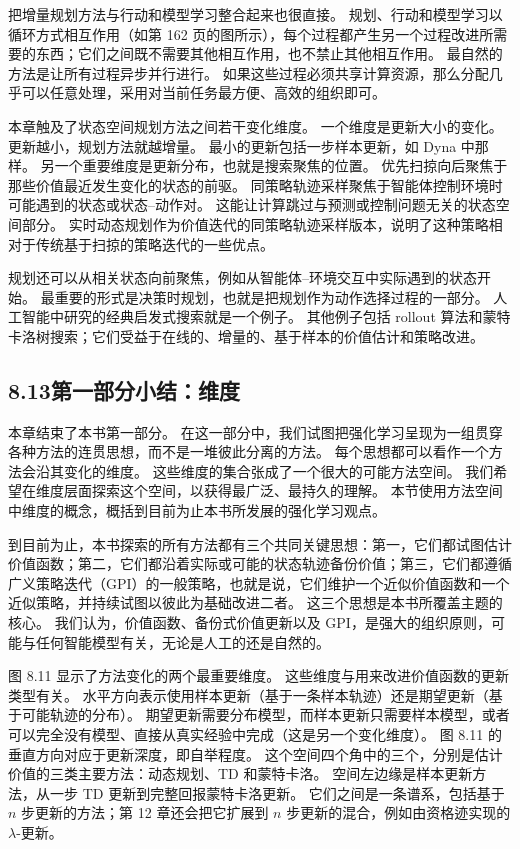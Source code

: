 \documentclass[UTF8, 12pt, fontset=fandol, oneside]{ctexart}
\begin{document}
把增量规划方法与行动和模型学习整合起来也很直接。
规划、行动和模型学习以循环方式相互作用（如第 162 页的图所示），每个过程都产生另一个过程改进所需要的东西；它们之间既不需要其他相互作用，也不禁止其他相互作用。
最自然的方法是让所有过程异步并行进行。
如果这些过程必须共享计算资源，那么分配几乎可以任意处理，采用对当前任务最方便、高效的组织即可。

本章触及了状态空间规划方法之间若干变化维度。
一个维度是更新大小的变化。
更新越小，规划方法就越增量。
最小的更新包括一步样本更新，如 Dyna 中那样。
另一个重要维度是更新分布，也就是搜索聚焦的位置。
优先扫掠向后聚焦于那些价值最近发生变化的状态的前驱。
同策略轨迹采样聚焦于智能体控制环境时可能遇到的状态或状态--动作对。
这能让计算跳过与预测或控制问题无关的状态空间部分。
实时动态规划作为价值迭代的同策略轨迹采样版本，说明了这种策略相对于传统基于扫掠的策略迭代的一些优点。

规划还可以从相关状态向前聚焦，例如从智能体--环境交互中实际遇到的状态开始。
最重要的形式是决策时规划，也就是把规划作为动作选择过程的一部分。
人工智能中研究的经典启发式搜索就是一个例子。
其他例子包括 rollout 算法和蒙特卡洛树搜索；它们受益于在线的、增量的、基于样本的价值估计和策略改进。

\subsection*{8.13\quad 第一部分小结：维度}

本章结束了本书第一部分。
在这一部分中，我们试图把强化学习呈现为一组贯穿各种方法的连贯思想，而不是一堆彼此分离的方法。
每个思想都可以看作一个方法会沿其变化的维度。
这些维度的集合张成了一个很大的可能方法空间。
我们希望在维度层面探索这个空间，以获得最广泛、最持久的理解。
本节使用方法空间中维度的概念，概括到目前为止本书所发展的强化学习观点。

到目前为止，本书探索的所有方法都有三个共同关键思想：第一，它们都试图估计价值函数；第二，它们都沿着实际或可能的状态轨迹备份价值；第三，它们都遵循广义策略迭代（GPI）的一般策略，也就是说，它们维护一个近似价值函数和一个近似策略，并持续试图以彼此为基础改进二者。
这三个思想是本书所覆盖主题的核心。
我们认为，价值函数、备份式价值更新以及 GPI，是强大的组织原则，可能与任何智能模型有关，无论是人工的还是自然的。

图 8.11 显示了方法变化的两个最重要维度。
这些维度与用来改进价值函数的更新类型有关。
水平方向表示使用样本更新（基于一条样本轨迹）还是期望更新（基于可能轨迹的分布）。
期望更新需要分布模型，而样本更新只需要样本模型，或者可以完全没有模型、直接从真实经验中完成（这是另一个变化维度）。
图 8.11 的垂直方向对应于更新深度，即自举程度。
这个空间四个角中的三个，分别是估计价值的三类主要方法：动态规划、TD 和蒙特卡洛。
空间左边缘是样本更新方法，从一步 TD 更新到完整回报蒙特卡洛更新。
它们之间是一条谱系，包括基于 $n$ 步更新的方法；第 12 章还会把它扩展到 $n$ 步更新的混合，例如由资格迹实现的 $\lambda$-更新。
\end{document}
